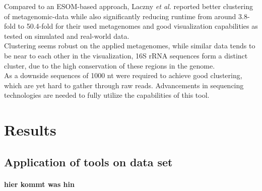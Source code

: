 \documentclass[twocolumn]{bmcart}%
\begin{document}
Compared to an ESOM-based approach, Laczny \textit{et al.} reported better clustering of metagenomic-data while also significantly reducing runtime from around 3.8-fold to 50.4-fold\cite{Laczny2014} for their used metagenomes and good visualization capabilities as tested on simulated and real-world data.\\
Clustering seems robust on the applied metagenomes, while similar data tends to be near to each other in the visualization, 16S rRNA sequences form a distinct cluster, due to the high conservation of these regions in the genome.\\
As a downside sequences of 1000 nt were required to achieve good clustering, which are yet hard to gather through raw reads. Advancements in sequencing technologies are needed to fully utilize the capabilities of this tool.
\section*{Results}
\subsection*{Application of tools on data set}
\paragraph*{hier kommt was hin}


\end{document}
